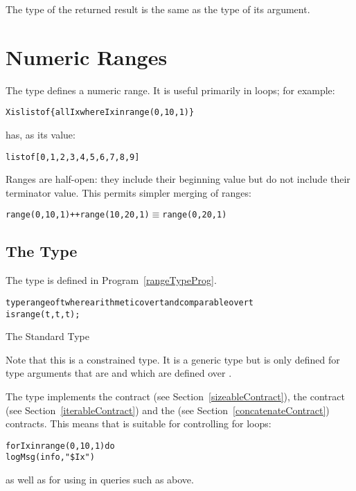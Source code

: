 The type of the returned result is the same as the type of its argument.

\section{Numeric Ranges}
\label{numericRange}
The  type defines a numeric range. It is useful primarily in loops; for example:
\begin{alltt}
X is list of \{all Ix where Ix in range(0,10,1) \}
\end{alltt}
has, as its value:
\begin{alltt}
list of [0, 1, 2, 3, 4, 5, 6, 7, 8, 9]
\end{alltt}

\begin{aside}
Ranges are half-open: they include their beginning value but do not include their terminator value. This permits simpler merging of ranges:
\begin{alltt}
range(0,10,1)++range(10,20,1) \ensuremath{\equiv} range(0,20,1)
\end{alltt}
\end{aside}

\subsection{The  Type}
The  type is defined in Program~\vref{rangeTypeProg}.
\begin{program}
\begin{alltt}
type range of t where arithmetic over t and comparable over t 
  is range(t,t,t);
\end{alltt}
\caption{The Standard  Type\label{rangeTypeProg}}
\end{program}

Note that this is a constrained type. It is a generic type but is only defined for type arguments that are  and which are defined over .

The  type implements the  contract (see Section~\vref{sizeableContract}), the  contract (see Section~\ref{iterableContract}) and the  (see Section~\vref{concatenateContract}) contracts. This means that  is suitable for controlling for loops:
\begin{alltt}
for Ix in range(0,10,1) do
  logMsg(info,"\$Ix")
\end{alltt}
as well as for using in queries such as above.
